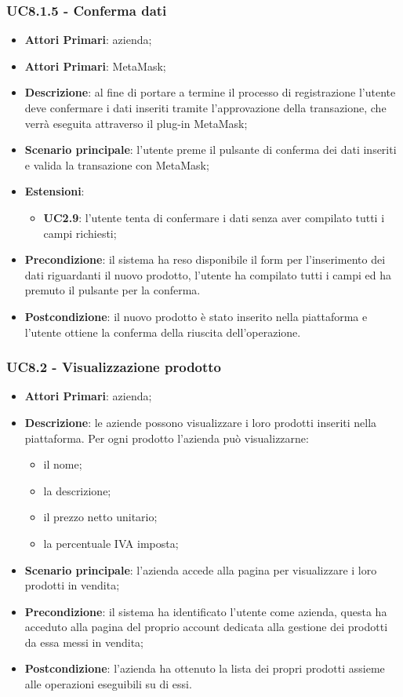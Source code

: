 \subsubsection{UC8.1.5 - Conferma dati}
\begin{itemize}
	\item \textbf{Attori Primari}: azienda;
	\item \textbf{Attori Primari}: MetaMask\glo;
	\item \textbf{Descrizione}: al fine di portare a termine il processo di registrazione l'utente deve confermare i dati inseriti tramite l'approvazione della transazione, che verrà eseguita attraverso il plug-in MetaMask\glo;
	\item \textbf{Scenario principale}: l'utente preme il pulsante di conferma dei dati inseriti e valida la transazione con MetaMask\glo;
	\item \textbf{Estensioni}:
	\begin{itemize}
		\item \textbf{UC2.9}: l'utente tenta di confermare i dati senza aver compilato tutti i campi richiesti;
	\end{itemize}
	\item \textbf{Precondizione}: il sistema ha reso disponibile il form per l'inserimento dei dati riguardanti il nuovo prodotto, l'utente ha compilato tutti i campi ed ha premuto il pulsante per la conferma.
	\item \textbf{Postcondizione}: il nuovo prodotto è stato inserito nella piattaforma e l'utente ottiene la conferma della riuscita dell'operazione.
\end{itemize}

\subsubsection{UC8.2 - Visualizzazione prodotto}
\begin{itemize}
	\item \textbf{Attori Primari}: azienda;
	\item \textbf{Descrizione}: le aziende possono visualizzare i loro prodotti inseriti nella piattaforma. Per ogni prodotto l'azienda può visualizzarne:
	\begin{itemize}
		\item il nome;
		\item la descrizione;
		\item il prezzo netto unitario;
		\item la percentuale IVA imposta;
	\end{itemize}
	\item \textbf{Scenario principale}: l'azienda accede alla pagina per visualizzare i loro prodotti in vendita;	
	\item \textbf{Precondizione}: il sistema ha identificato l'utente come azienda, questa ha acceduto alla pagina del proprio account dedicata alla gestione dei prodotti da essa messi in vendita;
	\item \textbf{Postcondizione}: l'azienda ha ottenuto la lista dei propri prodotti assieme alle operazioni eseguibili su di essi.	
\end{itemize}

